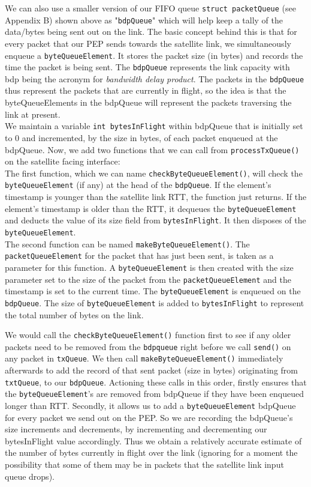 \documentclass{uathesis}
\begin{document}
We can also use a smaller version of our FIFO queue {\tt struct packetQueue} (see Appendix B) shown above as "{\tt bdpQueue}" which will help keep a tally of the data/bytes being sent out on the link. The basic concept behind this is that for every packet that our PEP sends towards the satellite link, we simultaneously enqueue a {\tt byteQueueElement}. It stores the packet size (in bytes) and records the time the packet is being sent. The {\tt bdpQueue} represents the link capacity with bdp being the acronym for \emph{bandwidth delay product}. The packets in the {\tt bdpQueue} thus represent the packets that are currently in flight, so the idea is that the byteQueueElements in the bdpQueue will represent the packets traversing the link at present.\\

We maintain a variable {\tt int bytesInFlight} within bdpQueue that is initially set to 0 and incremented, by the size in bytes, of each packet enqueued at the bdpQueue. Now, we add two functions that we can call from {\tt processTxQueue()} on the satellite facing interface: \\

The first function, which we can name {\tt checkByteQueueElement()}, will check the {\tt byteQueueElement} (if any) at the head of the {\tt bdpQueue}. If the element's timestamp is younger than the satellite link RTT, the function just returns. If the element's timestamp is older than the RTT, it dequeues the {\tt byteQueueElement} and deducts the value of its size field from {\tt bytesInFlight}. It then disposes of the {\tt byteQueueElement}. \\

The second function can be named {\tt makeByteQueueElement()}. The {\tt packetQueueElement} for the packet that has just been sent, is taken as a parameter for this function. A {\tt byteQueueElement} is then created with the size parameter set to the size of the packet from the {\tt packetQueueElement} and the timestamp is set to the current time. The {\tt byteQueueElement} is enqueued on the {\tt bdpQueue}. The size of {\tt byteQueueElement} is added to {\tt bytesInFlight} to represent the total number of bytes on the link.

We would call the {\tt checkByteQueueElement()} function first to see if any older packets need to be removed from the {\tt bdpqueue} right before we call {\tt send()} on any packet in {\tt txQueue}. We then call {\tt makeByteQueueElement()} immediately afterwards to add the record of that sent packet (size in bytes) originating from {\tt txtQueue}, to our {\tt bdpQueue}. Actioning these calls in this order, firstly ensures that the {\tt byteQueueElement}'s are removed from bdpQueue if they have been enqueued longer than RTT. Secondly, it allows us to add a {\tt byteQueueElement} bdpQueue for every packet we send out on the PEP. So we are recording the bdpQueue's size increments and decrements, by incrementing and decrementing our bytesInFlight value accordingly. Thus we obtain a relatively accurate estimate of the number of bytes currently in flight over the link (ignoring for a moment the possibility that some of them may be in packets that the satellite link input queue drops). 
\end{document}
